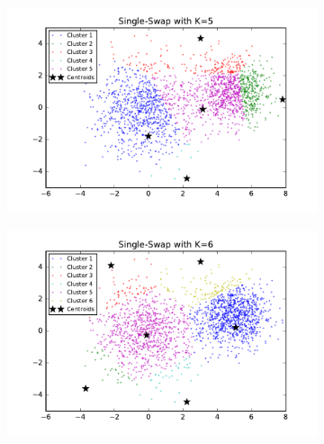 \begin{figure}[htb]
\begin{subfigure}[b]{0.475\textwidth}
        \end{subfigure}
        \begin{subfigure}[b]{0.475\textwidth}  
            \centering 
            \includegraphics[width=\textwidth]{./figures/clustering_singleSwap_5.pdf}
        \end{subfigure}
        \hfill
        \begin{subfigure}[b]{0.475\textwidth}   
            \centering 
            \includegraphics[width=\textwidth]{./figures/clustering_singleSwap_6.pdf}
        \end{subfigure}
        \begin{subfigure}[b]{0.475\textwidth}   
            \centering 

\end{subfigure}
\end{figure}
